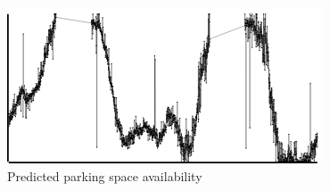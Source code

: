 \begin{figure}
  \centering
  \caption{Predicted parking space availability}
  \label{fig:predictions}
  \includegraphics[scale=0.5]{fig_predictions}
\end{figure}
